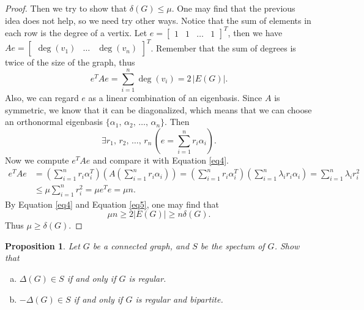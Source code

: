 \documentclass{article}
\newtheorem{proposition}{\bf Proposition}
\begin{document}
\begin{proof}
    Then we try to show that $\delta(G)\leq\mu$. One may find that the previous idea does not help, so we need try other ways. Notice that the sum of elements in each row is the degree of a vertix. Let $e=\begin{bmatrix}
        1 & 1 & \ldots & 1
    \end{bmatrix}^T$, then we have $Ae=\begin{bmatrix}
        \deg(v_1) & \ldots & \deg(v_n)
    \end{bmatrix}^T$. Remember that the sum of degrees is twice of the size of the graph, thus
    \begin{equation}\label{eq4}
        e^TAe=\sum_{i=1}^{n}\deg(v_i)=2\,\vert E(G)\vert.
    \end{equation}
    Also, we can regard $e$ as a linear combination of an eigenbasis. Since $A$ is symmetric, we know that it can be diagonalized, which means that we can choose an orthonormal eigenbasis $\{\alpha_1,\,\alpha_2,\,\ldots,\,\alpha_n\}$. Then
    \begin{equation*}
        \exists r_1,\,r_2,\,\ldots,\,r_n\,(e=\sum_{i=1}^{n}r_i\alpha_i).
    \end{equation*}
    Now we compute $e^TAe$ and compare it with Equation \eqref{eq4}.
    \begin{equation}\label{eq5}
        \begin{split}
            e^TAe&=(\sum_{i=1}^{n}r_i\alpha^T_i)\left(A(\sum_{i=1}^{n}r_i\alpha_i)\right)=(\sum_{i=1}^{n}r_i\alpha^T_i)(\sum_{i=1}^{n}\lambda_i r_i\alpha_i)=\sum_{i=1}^{n}\lambda_ir_i^2\\
            &\leq\mu\sum_{i=1}^{n}r_i^2=\mu e^Te=\mu n.
        \end{split}
    \end{equation}
    By Equation \eqref{eq4} and Equation \eqref{eq5}, one may find that 
    \begin{equation*}
        \mu n \geq 2 \vert E(G) \vert \geq n \delta(G).
    \end{equation*}
    Thus $\mu\geq\delta(G)$.
\end{proof}

\newpage
\begin{proposition}
    Let $G$ be a connected graph, and $S$ be the spectum of $G$. Show that
    \begin{enumerate}[(a)]
        \item $\Delta(G)\in S$ if and only if $G$ is regular.
        \item $-\Delta(G)\in S$ if and only if $G$ is regular and bipartite.
    \end{enumerate}
\end{proposition}
\end{document}

